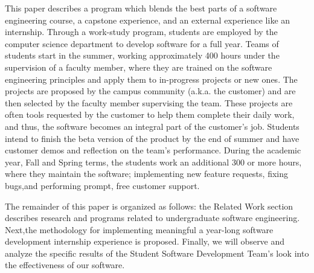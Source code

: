 This paper describes a program which blends the best parts of a software engineering course, a capstone experience, and an external experience like an internship. Through a work-study program, students are employed by the computer science department to develop software for a full year. Teams of students start in the summer, working approximately 400 hours under the supervision of a faculty member, where they are trained on the software engineering principles and apply them to in-progress projects or new ones. The projects are proposed by the campus community (a.k.a. the customer) and are then selected by the faculty member supervising the team. These projects are often tools requested by the customer to help them complete their daily work, and thus, the software becomes an integral part of the customer's job. Students intend to finish the beta version of the product by the end of summer and have customer demos and reflection on the team's performance. During the academic year, Fall and Spring terms, the students work an additional 300 or more hours, where they maintain the software; implementing new feature requests, fixing bugs,and performing prompt, free customer support. 

The remainder of this paper is organized as follows: the Related Work section describes research and programs related to undergraduate software engineering. Next,the methodology for implementing meaningful a year-long software development internship experience is proposed. Finally, we will observe and analyze the specific results of the Student Software Development Team's look into the effectiveness of our software.
